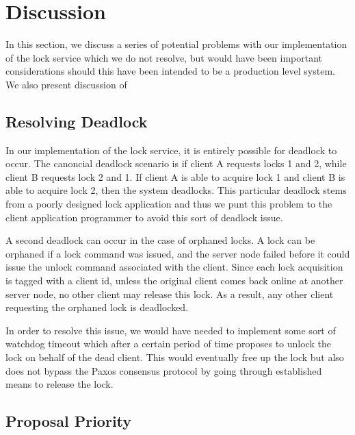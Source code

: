 \documentclass{article}
\begin{document}

\section{Discussion}

In this section, we discuss a series of potential problems with our implementation of the lock service which we do not resolve, but would have been important considerations should this have been intended to be a production level system.
We also present discussion of

\subsection{Resolving Deadlock}

In our implementation of the lock service, it is entirely possible for deadlock to occur.
The canoncial deadlock scenario is if client A requests locks 1 and 2, while client B requests lock 2 and 1.
If client A is able to acquire lock 1 and client B is able to acquire lock 2, then the system deadlocks.
This particular deadlock stems from a poorly designed lock application and thus we punt this problem to the client application programmer to avoid this sort of deadlock issue.

A second deadlock can occur in the case of orphaned locks.
A lock can be orphaned if a lock command was issued, and the server node failed before it could issue the unlock command associated with the client.
Since each lock acquisition is tagged with a client id, unless the original client comes back online at another server node, no other client may release this lock.
As a result, any other client requesting the orphaned lock is deadlocked.

In order to resolve this issue, we would have needed to implement some sort of watchdog timeout which after a certain period of time proposes to unlock the lock on behalf of the dead client.
This would eventually free up the lock but also does not bypass the Paxos consensus protocol by going through established means to release the lock.

\subsection{Proposal Priority}
\end{document}
